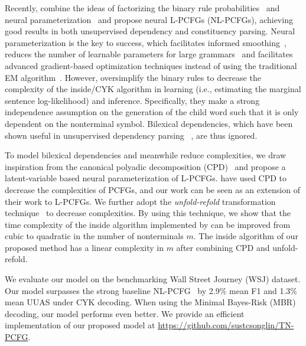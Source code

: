 \documentclass[11pt,a4paper]{article}
\begin{document}
Recently, \citet{zhu-etal-2020-return} combine the ideas of factorizing the binary rule probabilities~\citep{collins-2003-head} and neural parameterization~\citep{kim-etal-2019-compound} and propose neural L-PCFGs (NL-PCFGs), achieving good results in both unsupervised dependency and constituency parsing.  Neural parameterization is the key to success, which facilitates informed smoothing~\cite{kim-etal-2019-compound}, reduces the number of learnable parameters for large grammars~\cite{chiu-rush-2020-scaling, yang-etal-2021-pcfgs} and facilitates advanced gradient-based optimization techniques instead of using the traditional EM algorithm~\cite{eisner-2016-inside}. However, \citet{zhu-etal-2020-return} oversimplify the binary rules to decrease the complexity of the inside/CYK algorithm in learning (i.e., estimating the marginal sentence log-likelihood) and inference. Specifically, they make a strong independence assumption on the generation of the child word such that 
it is only dependent on the nonterminal symbol. Bilexical dependencies, which have been shown useful in unsupervised dependency parsing ~\cite{han-etal-2017-dependency, yang-etal-2020-second}, are thus ignored.



To model bilexical dependencies and meanwhile reduce complexities, we draw inspiration from the canonical polyadic decomposition (CPD)~\cite{CPD} and propose a latent-variable based neural parameterization of L-PCFGs. \citet{cohen-etal-2013-approximate,  yang-etal-2021-pcfgs} have used CPD to decrease the complexities of PCFGs, and our work can be seen as an extension of their work to L-PCFGs. 
We further adopt the \emph{unfold-refold} transformation technique~\cite{ eisner-blatz-2007} to decrease complexities. By using this technique, we show that the time complexity of the inside algorithm implemented by \citet{zhu-etal-2020-return} can be improved from cubic to quadratic in the number of nonterminals $m$. The inside algorithm of our proposed method has a linear complexity in $m$ after combining CPD and unfold-refold.




We evaluate our model on the benchmarking Wall Street Journey (WSJ) dataset. Our model surpasses the strong baseline NL-PCFG~\cite{zhu-etal-2020-return} by 2.9$\%$ mean F1 and 1.3$\%$ mean UUAS under CYK decoding. When using the Minimal Bayes-Risk (MBR) decoding, our model performs even better. We provide an efficient implementation of our proposed model at \url{https://github.com/sustcsonglin/TN-PCFG}.
\end{document}
